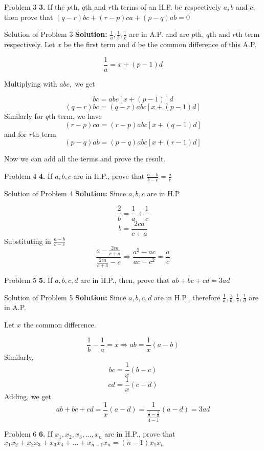 \documentclass[aspectratio=1610,8pt]{beamer}
\begin{document}
\begin{frame}{Problem 3}
  \textbf{3.} If the $p$th, $q$th and $r$th terms of an H.P. be respectively
  $a, b$ and $c,$ then prove that $(q - r)bc + (r - p)ca + (p - q)ab = 0$
\end{frame}
\begin{frame}{Solution of Problem 3}
  \textbf{Solution:} $\frac{1}{a}, \frac{1}{b}, \frac{1}{c}$ are in A.P. and
  are $p$th, $q$th and $r$th term respectively. Let $x$ be the first term and
  $d$ be the common difference of this A.P.

  $$\frac{1}{a} = x +(p - 1)d$$

  Multiplying with $abc,$ we get

  $$bc = abc[x + (p - 1)]d$$
  $$(q - r)bc = (q-r)abc[x + (p - 1)d]$$
  Similarly for $q$th term, we have
  $$(r - p)ca = (r - p)abc[x + (q - 1)d]$$
  and for $r$th term
  $$(p - q)ab = (p - q)abc[x + (r - 1)d]$$

  Now we can add all the terms and prove the result.
\end{frame}
\begin{frame}{Problem 4}
  \textbf{4.} If $a, b, c$ are in H.P., prove that $\frac{a - b}{b - c} =
  \frac{a}{c}$
\end{frame}
\begin{frame}{Solution of Problem 4}
  \textbf{Solution: } Since $a, b, c$ are in H.P

  $$\frac{2}{b} = \frac{1}{a} + \frac{1}{c}$$
  $$b = \frac{2ca}{c + a}$$
  Substituting in $\frac{a - b}{b - c}$
  $$\frac{a - \frac{2ca}{c + a}}{\frac{2ca}{c + a} - c} \Rightarrow \frac{a^2 -
      ac}{ac - c^2} = \frac{a}{c}$$
\end{frame}
\begin{frame}{Problem 5}
  \textbf{5.} If $a, b, c, d$ are in H.P., then, prove that $ab + bc + cd =
  3ad$
\end{frame}
\begin{frame}{Solution of Problem 5}
  \textbf{Solution:} Since $a, b, c, d$ are in H.P., therefore $\frac{1}{a},
  \frac{1}{b}, \frac{1}{c}, \frac{1}{d}$ are in A.P.

  Let $x$ the common difference.

  $$\frac{1}{b} - \frac{1}{a} = x\Rightarrow ab = \frac{1}{x}(a - b)$$
  Similarly,
  $$bc = \frac{1}{x}(b - c)$$
  $$cd  = \frac{1}{x}(c - d)$$
  Adding, we get
  $$ab + bc + cd = \frac{1}{x}(a - d) = \frac{1}{\frac{\frac{1}{d} -
      \frac{1}{a}}{4 - 1}}(a - d) = 3ad$$
\end{frame}
\begin{frame}{Problem 6}
  \textbf{6.} If $x_1, x_2, x_3, \ldots, x_n$ are in H.P., prove that $x_1x_2 +
  x_2x_3 + x_3x_4 + \ldots + x_{n - 1}x_n = (n - 1)x_1x_n$
\end{frame}
\end{document}
